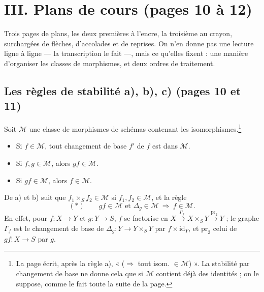 \documentclass[11pt,a4paper]{article}
\begin{document}
\section*{III. Plans de cours (pages 10 à 12)}

Trois pages de plans, les deux premières à l'encre, la troisième au crayon,
surchargées de flèches, d'accolades et de reprises. On n'en donne pas une
lecture ligne à ligne --- la transcription le fait ---, mais ce qu'elles fixent :
une manière d'organiser les classes de morphismes, et deux ordres de
traitement.

\subsection*{Les règles de stabilité a), b), c) (pages 10 et 11)}

Soit $\mathcal{M}$ une classe de morphismes de schémas contenant les
isomorphismes.\footnote{La page écrit, après la règle a), « ($\Rightarrow$ tout
isom. $\in \mathcal{M}$) ». La stabilité par changement de base ne donne cela
que si $\mathcal{M}$ contient déjà des identités ; on le suppose, comme le fait
toute la suite de la page.}

\begin{itemize}
  \item[a)] Si $f \in \mathcal{M}$, tout changement de base $f'$ de $f$ est
  dans $\mathcal{M}$.
  \item[b)] Si $f, g \in \mathcal{M}$, alors $gf \in \mathcal{M}$.
  \item[c)] Si $gf \in \mathcal{M}$, alors $f \in \mathcal{M}$.
\end{itemize}

De a) et b) suit que $f_1 \times_S f_2 \in \mathcal{M}$ si
$f_1, f_2 \in \mathcal{M}$, et la règle
\[
(*) \qquad gf \in \mathcal{M} \text{ et } \Delta_g \in \mathcal{M}
\ \Longrightarrow\ f \in \mathcal{M} .
\]
En effet, pour $f : X \to Y$ et $g : Y \to S$, $f$ se factorise en
$X \xrightarrow{\Gamma_f} X \times_S Y \xrightarrow{\mathrm{pr}_2} Y$ ; le
graphe $\Gamma_f$ est le changement de base de $\Delta_g : Y \to Y \times_S Y$
par $f \times \mathrm{id}_Y$, et $\mathrm{pr}_2$ celui de $gf : X \to S$ par
$g$.

\end{document}

